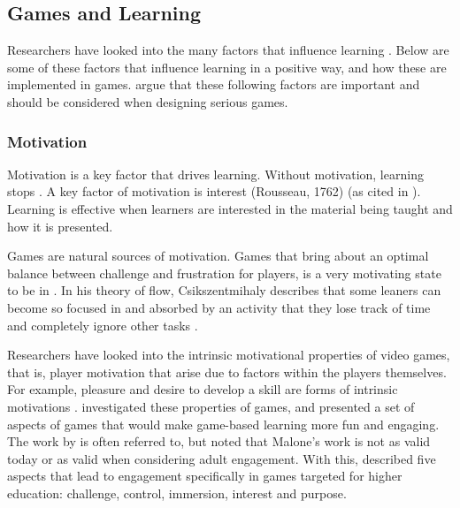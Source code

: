 \documentclass[a4paper,11.5pt]{report}
\numberwithin{figure}{section}
\numberwithin{table}{section}
\numberwithin{equation}{section}
\numberwithin{equation}{section}
\begin{document}

\subsection{Games and Learning}

Researchers have looked into the many factors that influence learning \citep{roungas2015}. Below are some of these factors that influence learning in a positive way, and how these are implemented in games. \citet{roungas2015} argue that these following factors are important and should be considered when designing serious games.

\subsubsection{Motivation}

Motivation is a key factor that drives learning. Without motivation, learning stops \citep{Gee2003}. A key factor of motivation is interest (Rousseau, 1762) (as cited in \citet{roungas2015}). Learning is effective when learners are interested in the material being taught and how it is presented. 

Games are natural sources of motivation. Games that bring about an optimal balance between challenge and frustration for players, is a very motivating state to be in \citep{Gee2003}. In his theory of flow, Csikszentmihaly describes that some leaners can become so focused in and absorbed by an activity that they lose track of time and completely ignore other tasks \citep{flow}. 

Researchers have looked into the intrinsic motivational properties of video games, that is, player motivation that arise due to factors within the players themselves. For example, pleasure and desire to develop a skill are forms of intrinsic motivations \citep{roungas2015}. \citet{Malone1987} investigated these properties of games, and presented a set of aspects of games that would make game-based learning more fun and engaging. The work by \citeauthor{Malone1987} is often referred to, but \citet{whitton2011} noted that Malone's work is not as valid today or as valid when considering adult engagement. With this, \citeauthor{whitton2011} described five aspects that lead to engagement specifically in games targeted for higher education: challenge, control, immersion, interest and purpose.
\end{document}
